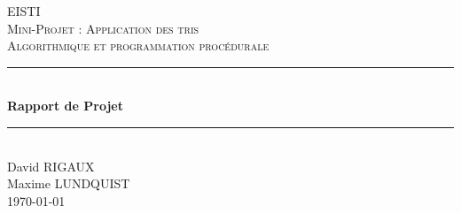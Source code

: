 \documentclass[13pt]{article}
\begin{document}
\lstset{language=Pascal} 
\begin{titlepage}

\newcommand{\HRule}{\rule{\linewidth}{0.5mm}} %

\center %
 

\textsc{\LARGE EISTI}\\[1.5cm] %
\textsc{\Large Mini-Projet : Application des tris}\\[0.5cm] %
\textsc{\large Algorithmique et programmation procédurale}\\[0.5cm] %


\HRule \\[0.4cm]
{ \huge \bfseries  Rapport de Projet}\\[0.4cm] %
\HRule \\[1cm]
 

\Large
David \textsc{RIGAUX}\\[0.5cm]
Maxime \textsc{LUNDQUIST}\\[1cm]


{\large \today}\\[1cm] %



\end{titlepage}
\end{document}
